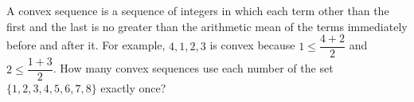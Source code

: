 A convex sequence is a sequence of integers in which each term other than the first and the last is no greater than the arithmetic mean of the terms immediately before and after it. For example, $4,1,2,3$ is convex because $1\le\dfrac{4+2}{2}$ and $2\le\dfrac{1+3}{2}$. How many convex sequences use each number of the set $\{1,2,3,4,5,6,7,8\}$ exactly once?
